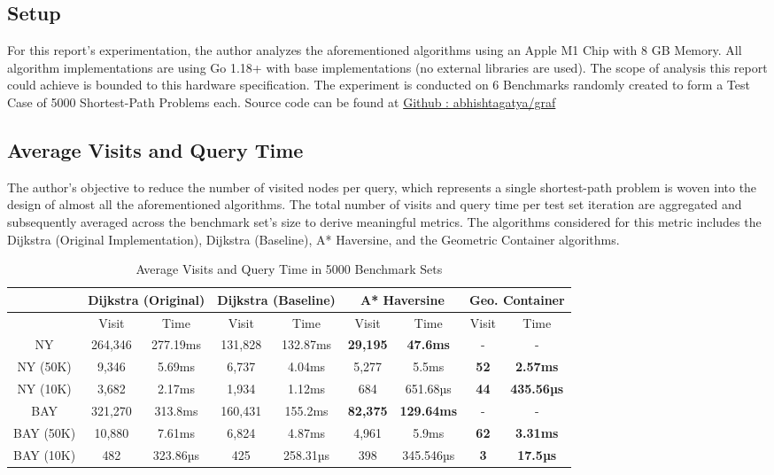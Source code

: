 \documentclass{article}
\begin{document}
\subsection{Setup}

For this report's experimentation, the author analyzes the aforementioned algorithms using an Apple M1 Chip with 8 GB Memory. All algorithm implementations are using Go 1.18+ with base implementations (no external libraries are used). The scope of analysis this report could achieve is bounded to this hardware specification. The experiment is conducted on 6 Benchmarks randomly created to form a Test Case of 5000 Shortest-Path Problems each. Source code can be found at \href{https://github.com/abhishtagatya/graf}{Github : abhishtagatya/graf}

\subsection{Average Visits and Query Time}

The author's objective to reduce the number of visited nodes per query, which represents a single shortest-path problem is woven into the design of almost all the aforementioned algorithms. The total number of visits and query time per test set iteration are aggregated and subsequently averaged across the benchmark set's size to derive meaningful metrics. The algorithms considered for this metric includes the Dijkstra (Original Implementation), Dijkstra (Baseline), A* Haversine, and the Geometric Container algorithms.

\begin{table}
    \centering
    \begin{tabular}{ccccccccc}
 & \multicolumn{2}{c}{Dijkstra (Original)}& \multicolumn{2}{c}{Dijkstra (Baseline)}& \multicolumn{2}{c}{A* Haversine}& \multicolumn{2}{c}{Geo. Container}\\
 \hline
         &  Visit&  Time&  Visit&  Time&  Visit&  Time&  Visit& Time\\
         \hline
         NY&  264,346&  277.19ms&  131,828&  132.87ms&  \textbf{29,195}&  \textbf{47.6ms} &  -& -\\
         NY (50K)&  9,346&  5.69ms&  6,737 &  4.04ms&  5,277&  5.5ms&  \textbf{52}& \textbf{2.57ms}\\
         NY (10K)&  3,682&  2.17ms&  1,934&  1.12ms&  684&  651.68µs&  \textbf{44}& \textbf{435.56µs}\\
         \hline
         BAY&  321,270&  313.8ms&  160,431&  155.2ms&  \textbf{82,375}&  \textbf{129.64ms}&  -& -\\
         BAY (50K)&  10,880&  7.61ms&  6,824&  4.87ms&  4,961&  5.9ms&  \textbf{62}& \textbf{3.31ms}\\
         BAY (10K)&  482&  323.86µs&  425&  258.31µs&  398&  345.546µs&  \textbf{3}& \textbf{17.5µs}\\
         \hline
    \end{tabular}
    \caption{Average Visits and Query Time in 5000 Benchmark Sets}
    \label{tab:avgvq}
\end{table}
\end{document}
